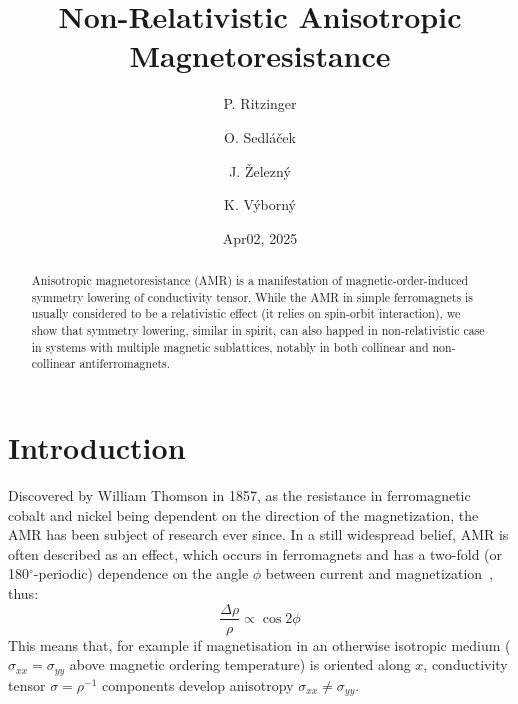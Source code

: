 \documentclass[prb,showpacs,amsmath,amssymb,superscriptaddress,twocolumn,floatfix]{revtex4-1}
\begin{document}
\title{Non-Relativistic Anisotropic Magnetoresistance}

\author{P. Ritzinger}

\author{O. Sedl\'a\v cek}
\author{J. \v Zelezn\'y}

\author{K. V\'yborn\'y}


\date{Apr02, 2025}

\begin{abstract}
Anisotropic magnetoresistance (AMR) is a manifestation of
magnetic-order-induced symmetry lowering of conductivity tensor.
While the AMR in simple ferromagnets is usually considered to be a
relativistic effect (it relies on spin-orbit interaction), we show
that symmetry lowering, similar in spirit, can also happed in
non-relativistic case in systems with multiple magnetic sublattices,
notably in both collinear and non-collinear antiferromagnets. 
\end{abstract}


\maketitle

\section{Introduction}

Discovered by William Thomson in 1857,\cite{Thomson:1857} as the
resistance in ferromagnetic cobalt and nickel being dependent on the
direction of the magnetization, the AMR has been subject of research
ever since.\cite{Ritzinger:2023} In a still widespread belief, AMR is
often described as an effect, which occurs in ferromagnets and has a
two-fold (or 180$^\circ$-periodic) dependence on the angle $\phi$ between current and magnetization~\cite{Alagoz:2015}, thus:
%
\begin{equation}
	\frac{\Delta \rho}{\rho} \propto \cos 2 \phi
	\label{eq_ncollAMR}
\end{equation}
%
This means that, for example if magnetisation in an otherwise
isotropic medium ($\sigma_{xx}=\sigma_{yy}$ above magnetic ordering
temperature) is oriented along $x$, conductivity tensor
$\sigma=\rho^{-1}$ components develop anisotropy $\sigma_{xx}\not=\sigma_{yy}$.
\end{document}
